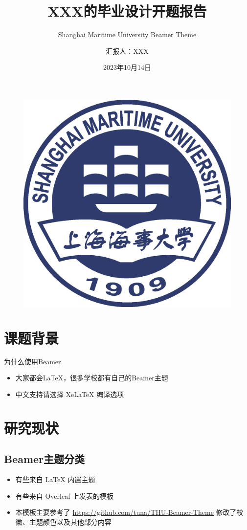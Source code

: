 \documentclass{beamer}
\author{汇报人：XXX}
\title{XXX的毕业设计开题报告}
\subtitle{Shanghai Maritime University Beamer Theme}
\institute{上海海事大学 物流科学与工程研究院}
\date{2023年10月14日}
\begin{document}
	
	\kaishu
	\begin{frame}
		\titlepage
		\begin{figure}[htpb]
			\begin{center}
				\includegraphics[width=0.2\linewidth]
				{Template/Pic/Shanghai_Maritime_University_Logo.eps}
			\end{center}
		\end{figure}
	\end{frame}
	
	\begin{frame}
		\tableofcontents[sectionstyle=show,subsectionstyle=show/shaded/hide,subsubsectionstyle=show/shaded/hide]
	\end{frame}
	
	
	\section{课题背景}
	
	\begin{frame}{为什么使用Beamer}
		\begin{itemize}[<+-| alert@+>] %
			\item 大家都会\LaTeX{}，很多学校都有自己的Beamer主题
			\item 中文支持请选择 Xe\LaTeX{} 编译选项
		\end{itemize}
	\end{frame}
	
	
	\section{研究现状}
	
	\subsection{Beamer主题分类}
	
	\begin{frame}
		\begin{itemize}
			\item 有些来自 \LaTeX{} 内置主题
			\item 有些来自 Overleaf 上发表的模板
			\item 本模板\cite{origin}主要参考了 \newline
			\url{https://github.com/tuna/THU-Beamer-Theme}
			\newline
			修改了校徽、主题颜色以及其他部分内容\cite{shmtu_vi}
		\end{itemize}
	\end{frame}
	
\end{document}
